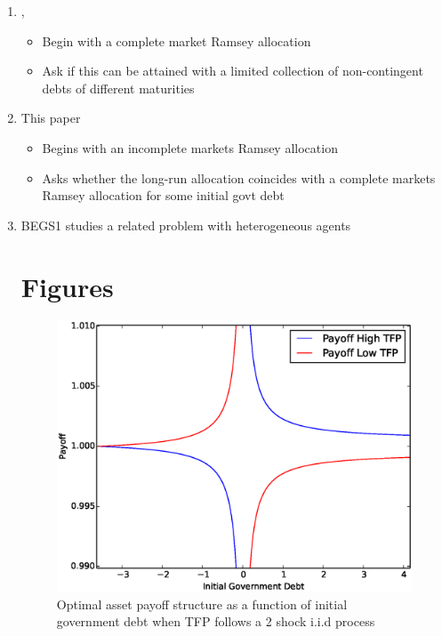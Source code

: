 \documentclass[12pt]{article}
\begin{document}
 \begin{enumerate}
  \item \citet{Angeletos}, \citet{Buera_Nicolini}

\begin{itemize}
 \item Begin with a complete market  Ramsey allocation
 \item Ask if this can be attained with a limited  collection of non-contingent debts of different maturities
\end{itemize}
\item This paper
\begin{itemize}
 \item Begins with an incomplete markets Ramsey allocation
 \item Asks whether the long-run allocation coincides with a complete markets Ramsey allocation for some initial govt debt
\end{itemize}

\item BEGS1 studies a related problem with heterogeneous agents


\section{Figures}

\begin{figure}
		\begin{center}
		\includegraphics[scale=.4]{Images/p_graph_tfp.eps}
		\caption{Optimal asset payoff structure as a function of initial government debt when TFP follows a 2 shock i.i.d process}
	\end{center}	
	\end{figure}



\end{enumerate}
\end{document}
